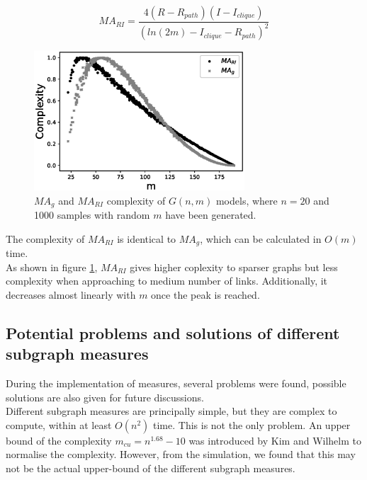\documentclass[12pt]{article}
\begin{document}
\begin{equation}
    MA_{RI} = \frac{4(R-R_{path})(I-I_{clique})}{(ln(2m)-I_{clique}-R_{path})^2}
\end{equation}
\begin{figure}[h]
    \centering
    \includegraphics[width=0.7\textwidth]{mariandmag.eps}
    \caption{$MA_g$ and $MA_{RI}$ complexity of $G(n,m)$ models, where $n=20$ and 1000 samples with random $m$ have been generated.}
    \label{fig:marimagcompare}
\end{figure}
\noindent
The complexity of $MA_{RI}$ is identical to $MA_g$, which can be calculated in $O(m)$ time.\\

As shown in figure \ref{fig:marimagcompare}, $MA_{RI}$ gives higher coplexity to sparser graphs but less complexity when approaching to medium number of links. Additionally, it decreases almost linearly with $m$ once the peak is reached.

\subsection{Potential problems and solutions of different subgraph measures}
\label{problem}
During the implementation of measures, several problems were found, possible solutions are also given for future discussions.\\
Different subgraph measures are principally simple, but they are complex to compute, within at least $O(n^2)$ time\cite{KIM20082637}. This is not the only problem. An upper bound of the complexity $m_{cu} = n^{1.68}-10$ was introduced by Kim and Wilhelm\cite{KIM20082637} to normalise the complexity. However, from the simulation, we found that this may not be the actual upper-bound of the different subgraph measures.
\end{document}
